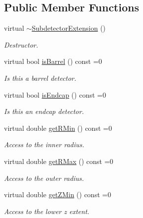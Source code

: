 \subsection*{Public Member Functions}
\begin{DoxyCompactItemize}
\item 
virtual \hyperlink{class_d_d4hep_1_1_d_d_rec_1_1_subdetector_extension_aa1aec61c92f4005d502f9419050f1b9b}{$\sim$\+Subdetector\+Extension} ()
\begin{DoxyCompactList}\small\item\em Destructor. \end{DoxyCompactList}\item 
virtual bool \hyperlink{class_d_d4hep_1_1_d_d_rec_1_1_subdetector_extension_a12be99462aa14feba6df7eed02468994}{is\+Barrel} () const =0
\begin{DoxyCompactList}\small\item\em Is this a barrel detector. \end{DoxyCompactList}\item 
virtual bool \hyperlink{class_d_d4hep_1_1_d_d_rec_1_1_subdetector_extension_a57a044e743f899391ac4a89fc0035e08}{is\+Endcap} () const =0
\begin{DoxyCompactList}\small\item\em Is this an endcap detector. \end{DoxyCompactList}\item 
virtual double \hyperlink{class_d_d4hep_1_1_d_d_rec_1_1_subdetector_extension_a2de40b96e752aee9d68559657c8b7874}{get\+R\+Min} () const =0
\begin{DoxyCompactList}\small\item\em Access to the inner radius. \end{DoxyCompactList}\item 
virtual double \hyperlink{class_d_d4hep_1_1_d_d_rec_1_1_subdetector_extension_a6d7b6e1818a7ca5054279ea5d372b7f4}{get\+R\+Max} () const =0
\begin{DoxyCompactList}\small\item\em Access to the outer radius. \end{DoxyCompactList}\item 
virtual double \hyperlink{class_d_d4hep_1_1_d_d_rec_1_1_subdetector_extension_a5229b92c90c65a76156b5ea082aa0301}{get\+Z\+Min} () const =0
\begin{DoxyCompactList}\small\item\em Access to the lower z extent. \end{DoxyCompactList}\item 

\end{DoxyCompactItemize}
